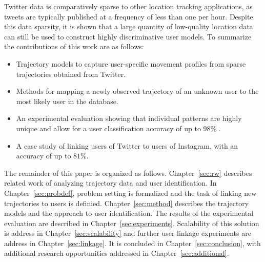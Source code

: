 Twitter data is comparatively sparse to other location tracking applications, as tweets are typically published at a frequency of less than one per hour. Despite this data sparsity, it is shown that a large quantity of low-quality location data can still be used to construct highly discriminative user models. To summarize the contributions of this work are as follows:

\begin{itemize}
	\item Trajectory models to capture user-specific movement profiles from sparse trajectories obtained from Twitter.
	\item Methods for mapping a newly observed trajectory of an unknown user to the most likely user in the database.
	\item An experimental evaluation showing that individual patterns are highly unique and allow for a user classification accuracy of up to 98\% .
	\item A case study of linking users of Twitter to users of Instagram, with an accuracy of up to $81\%$.
\end{itemize}

The remainder of this paper is organized as follows. Chapter~\ref{sec:rw} describes
related work of analyzing trajectory data and user identification. In Chapter~\ref{sec:probdef}, problem setting is formalized and the task of linking new trajectories to users is definied. Chapter~\ref{sec:method} describes the trajectory models and the approach to user identification. The results of the experimental evaluation are described in Chapter~\ref{sec:experiments}. Scalability of this solution is address in Chapter~\ref{sec:scalability} and further user linkage experiments are address in Chapter~\ref{sec:linkage}. It is concluded in Chapter~\ref{sec:conclusion}, with additional research opportunities addressed in Chapter~\ref{sec:additional}.
